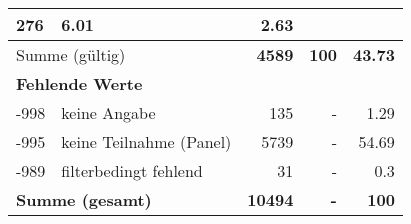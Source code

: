 \begin{longtable}{lXrrr}
       \num{276} &
       \num[round-mode=places,round-precision=2]{6,01} &
         \num[round-mode=places,round-precision=2]{2,63} \\
     \midrule
     \multicolumn{2}{l}{Summe (gültig)} &
       \textbf{\num{4589}} &
     \textbf{100} &
       \textbf{\num[round-mode=places,round-precision=2]{43,73}} \\
     \multicolumn{5}{l}{\textbf{Fehlende Werte}}\\
       -998 &
       keine Angabe &
         \num{135} &
        - &
         \num[round-mode=places,round-precision=2]{1,29} \\
       -995 &
       keine Teilnahme (Panel) &
         \num{5739} &
        - &
         \num[round-mode=places,round-precision=2]{54,69} \\
       -989 &
       filterbedingt fehlend &
         \num{31} &
        - &
         \num[round-mode=places,round-precision=2]{0,3} \\
     \midrule
     \multicolumn{2}{l}{\textbf{Summe (gesamt)}} &
          \textbf{\num{10494}} &
        \textbf{-} &
        \textbf{100} \\
     \bottomrule
     \end{longtable}
     
